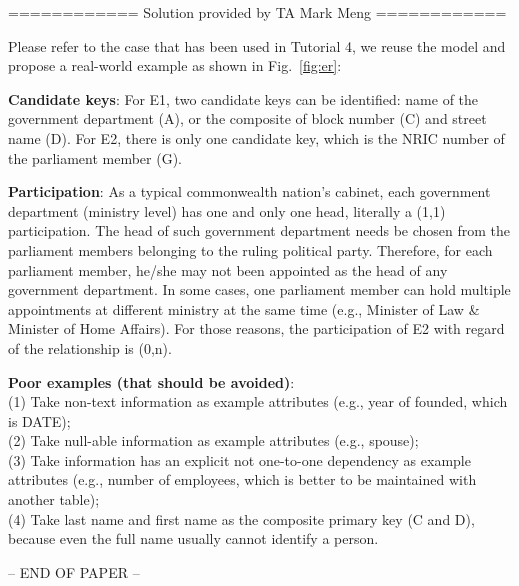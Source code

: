 \documentclass[10pt,a4paper,answers]{exam}
\begin{document}
\begin{questions}
\begin{parts}
\begin{solution}
\begin{center}
	============ Solution provided by TA Mark Meng ============
\end{center}\vspace{5pt}

Please refer to the case that has been used in Tutorial 4, we reuse the model and propose a real-world example as shown in Fig.~\ref{fig:er}:	
\vspace{5pt}

\textbf{Candidate keys}: For E1, two candidate keys can be identified: name of the government department (A), or the composite of block number (C) and street name (D).
For E2, there is only one candidate key, which is the NRIC number of the parliament member (G).

\textbf{Participation}: As a typical commonwealth nation's cabinet, each government department (ministry level) has one and only one head, literally a (1,1) participation. The head of such government department needs be chosen from the parliament members belonging to the ruling political party. Therefore, for each parliament member, he/she may not been appointed as the head of any government department. In some cases, one parliament member can hold multiple appointments at different ministry at the same time (e.g., Minister of Law \& Minister of Home Affairs). For those reasons, the participation of E2 with regard of the relationship is (0,n).

\vspace{5pt}
\textbf{Poor examples (that should be avoided)}: \\
(1) Take non-text information as example attributes (e.g., year of founded, which is DATE);\\
(2) Take null-able information as example attributes (e.g., spouse);\\
(3) Take information has an explicit not one-to-one dependency as example attributes (e.g., number of employees, which is better to be maintained with another table);\\
(4) Take last name and first name as the composite primary key (C and D), because even the full name usually cannot identify a person.

\end{solution}
\end{parts}
\end{questions}

\begin{center}-- END OF PAPER --\end{center}
\end{document}
